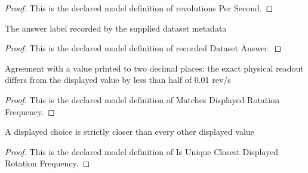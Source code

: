 \begin{proof}
  This is the declared model definition of revolutions Per Second.
\end{proof}
\begin{definition}
  \label{def:physics:phyx-mini-0711:phyxminiproblems-problemphyxmini0711-recordeddatasetanswer}
  The answer label recorded by the supplied dataset metadata
\end{definition}
\begin{proof}
  This is the declared model definition of recorded Dataset Answer.
\end{proof}
\begin{definition}
  \label{def:physics:phyx-mini-0711:phyxminiproblems-problemphyxmini0711-matchesdisplayedrotationfrequency}
  Agreement with a value printed to two decimal places: the exact physical readout differs from the displayed value by less than half of 0.01 rev/s
\end{definition}
\begin{proof}
  This is the declared model definition of Matches Displayed Rotation Frequency.
\end{proof}
\begin{definition}
  \label{def:physics:phyx-mini-0711:phyxminiproblems-problemphyxmini0711-isuniqueclosestdisplayedrotationfrequency}
  A displayed choice is strictly closer than every other displayed value
\end{definition}
\begin{proof}
  This is the declared model definition of Is Unique Closest Displayed Rotation Frequency.
\end{proof}

